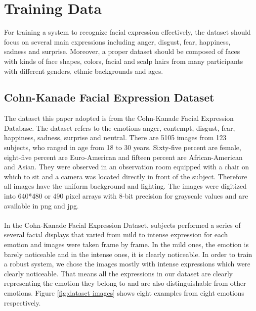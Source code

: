 \section{Training Data}

For training a system to recognize facial expression effectively, the dataset should focus on several main expressions including anger, disgust, fear, happiness, sadness and surprise. Moreover, a proper dataset should be composed of faces with kinds of face shapes, colors, facial and scalp hairs from many participants with different genders, ethnic backgrounds and ages.


\subsection{Cohn-Kanade Facial Expression Dataset}
\nocite{Kanade2000CK+}\nocite{Lucey2010CK+}

The dataset this paper adopted is from the Cohn-Kanade Facial Expression Database. The dataset refers to the emotions anger, contempt, disgust, fear, happiness, sadness, surprise and neutral. There are 5105 images from 123 subjects, who ranged in age from 18 to 30 years. Sixty-five percent are female, eight-five percent are Euro-American and fifteen percent are African-American and Asian. They were observed in an observation room equipped with a chair on which to sit and a camera was located directly in front of the subject. Therefore all images have the uniform background and lighting. The images were digitized into 640*480 or 490 pixel arrays with 8-bit precision for grayscale values and are available in png and jpg.
\\
\\
In the Cohn-Kanade Facial Expression Dataset, subjects performed a series of several facial displays that varied from mild to intense expression for each emotion and images were taken frame by frame.  In the mild ones, the emotion is barely noticeable and in the intense ones, it is clearly noticeable. In order to train a robust system, we chose the images mostly with intense expressions which were clearly noticeable. That means all the expressions in our dataset are clearly representing the emotion they belong to and are also distinguishable from other emotions. Figure \ref{fig:dataset images} shows eight examples from eight emotions respectively.



